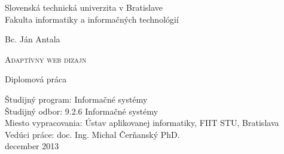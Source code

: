 

\setlength{\parindent}{0cm}

\thispagestyle{empty}

\begin{center}
\begin{LARGE}
\textmd{
Slovenská technická univerzita v Bratislave\\
\vspace*{0.2cm}
Fakulta informatiky a informačných technológií  
}
\end{LARGE}

\vspace*{1.0cm}
\begin{Large}
\end{Large}

\end{center}

\vspace{5.5cm}

\begin{center}
{\Large \textmd{{Bc. Ján Antala}}}
\end{center}

\vspace{0.1cm}
\begin{huge}
\begin{center}
\textsc{Adaptívny web dizajn}
\end{center}
\end{huge}

\vspace{0.5cm}
\begin{center}
{\Large{\textmd{Diplomová práca}}}\\
\end{center}

\vspace{5.5cm}

\begin{flushleft}
\large{Študijný program: Informačné systémy} \\
\large{Študijný odbor: 9.2.6 Informačné systémy} \\
\large{Miesto vypracovania:  Ústav aplikovanej informatiky, FIIT STU, Bratislava} \\
\large{Vedúci práce: doc. Ing. Michal Čerňanský PhD.} \\
\vspace{1.0cm}
\large{december 2013} \\
\end{flushleft}


